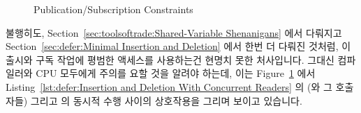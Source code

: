 \begin{figure}[tb]
\centering
{}
\caption{Publication/Subscription Constraints}
\label{fig:defer:Publication/Subscription Constraints}
\end{figure}

불행히도,
Section~\ref{sec:toolsoftrade:Shared-Variable Shenanigans}
에서 다뤄지고
Section~\ref{sec:defer:Minimal Insertion and Deletion} 에서 한번 더 다뤄진
것처럼, 이 출시와 구독 작업에 평범한 액세스를 사용하는건 현명치 못한
처사입니다.
그대신 컴파일러와 CPU 모두에게 주의를 요할 것을 알려야 하는데, 이는
Figure~\ref{fig:defer:Publication/Subscription Constraints} 에서
Listing~\ref{lst:defer:Insertion and Deletion With Concurrent Readers}
의  (와 그 호출자들) 그리고  의 동시적 수행
사이의 상호작용을 그리며 보이고 있습니다.

